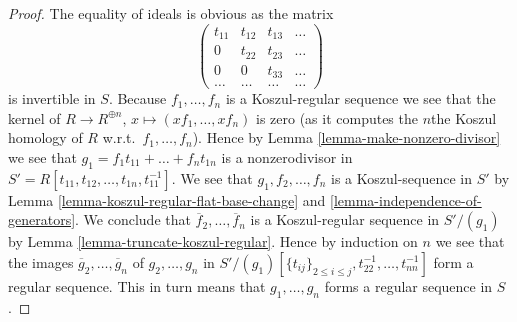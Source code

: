\documentclass[10pt,a4paper]{amsart}
\theoremstyle{plain}
\theoremstyle{definition}
\theoremstyle{remark}
\numberwithin{equation}{subsection}
\begin{document}
\begin{proof}
The equality of ideals is obvious as the matrix
$$
\left(
\begin{matrix}
t_{11} & t_{12} & t_{13} & \ldots \\
0 & t_{22} & t_{23} & \ldots \\
0 & 0 & t_{33} & \ldots \\
\ldots & \ldots & \ldots & \ldots
\end{matrix}
\right)
$$
is invertible in $S$.
Because $f_1, \ldots, f_n$ is a Koszul-regular sequence we see that
the kernel of
$R \to R^{\oplus n}$, $x \mapsto (xf_1, \ldots, xf_n)$ is zero (as it
computes the $n$the Koszul homology of $R$ w.r.t.\ $f_1, \ldots, f_n$).
Hence by
Lemma \ref{lemma-make-nonzero-divisor}
we see that $g_1 = f_1 t_{11} + \ldots + f_n t_{1n}$ is a nonzerodivisor
in $S' = R[t_{11}, t_{12}, \ldots, t_{1n}, t_{11}^{-1}]$. We see that
$g_1, f_2, \ldots, f_n$ is a Koszul-sequence in $S'$ by
Lemma \ref{lemma-koszul-regular-flat-base-change} and
\ref{lemma-independence-of-generators}.
We conclude that
$\overline{f}_2, \ldots, \overline{f}_n$ is a Koszul-regular sequence
in $S'/(g_1)$ by
Lemma \ref{lemma-truncate-koszul-regular}.
Hence by induction on $n$ we see that the images
$\overline{g}_2, \ldots, \overline{g}_n$ of $g_2, \ldots, g_n$ in
$S'/(g_1)[\{t_{ij}\}_{2 \leq i \leq j}, t_{22}^{-1}, \ldots, t_{nn}^{-1}]$
form a regular sequence. This in turn means that
$g_1, \ldots, g_n$ forms a regular sequence in $S$.
\end{proof}
\end{document}
